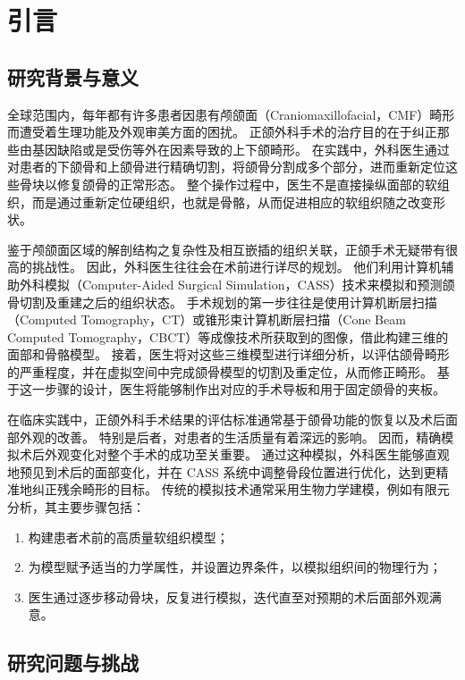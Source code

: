 \chapter{引言}

\section{研究背景与意义}

全球范围内，每年都有许多患者因患有颅颌面（Craniomaxillofacial，CMF）畸形而遭受着生理功能及外观审美方面的困扰。
正颌外科手术的治疗目的在于纠正那些由基因缺陷或是受伤等外在因素导致的上下颌畸形。
在实践中，外科医生通过对患者的下颌骨和上颌骨进行精确切割，将颌骨分割成多个部分，进而重新定位这些骨块以修复颌骨的正常形态。
整个操作过程中，医生不是直接操纵面部的软组织，而是通过重新定位硬组织，也就是骨骼，从而促进相应的软组织随之改变形状。

鉴于颅颌面区域的解剖结构之复杂性及相互嵌插的组织关联，正颌手术无疑带有很高的挑战性。
因此，外科医生往往会在术前进行详尽的规划。
他们利用计算机辅助外科模拟（Computer-Aided Surgical Simulation，CASS）技术来模拟和预测颌骨切割及重建之后的组织状态。
手术规划的第一步往往是使用计算机断层扫描（Computed Tomography，CT）或锥形束计算机断层扫描（Cone Beam Computed Tomography，CBCT）等成像技术所获取到的图像，借此构建三维的面部和骨骼模型。
接着，医生将对这些三维模型进行详细分析，以评估颌骨畸形的严重程度，并在虚拟空间中完成颌骨模型的切割及重定位，从而修正畸形。
基于这一步骤的设计，医生将能够制作出对应的手术导板和用于固定颌骨的夹板。

在临床实践中，正颌外科手术结果的评估标准通常基于颌骨功能的恢复以及术后面部外观的改善。
特别是后者，对患者的生活质量有着深远的影响。
因而，精确模拟术后外观变化对整个手术的成功至关重要。
通过这种模拟，外科医生能够直观地预见到术后的面部变化，并在 CASS 系统中调整骨段位置进行优化，达到更精准地纠正残余畸形的目标。
传统的模拟技术通常采用生物力学建模，例如有限元分析，其主要步骤包括：
\begin{enumerate}
  \item 构建患者术前的高质量软组织模型；
  \item 为模型赋予适当的力学属性，并设置边界条件，以模拟组织间的物理行为；
  \item 医生通过逐步移动骨块，反复进行模拟，迭代直至对预期的术后面部外观满意。
\end{enumerate}

\section{研究问题与挑战}

